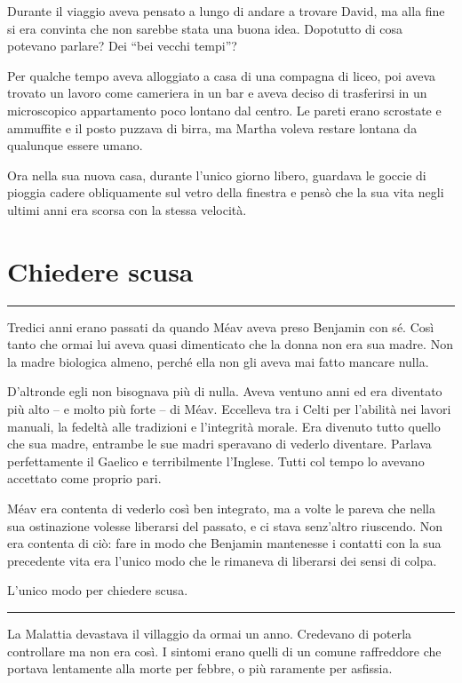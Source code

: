 \documentclass[a4paper,11pt,oneside,openright,final]{memoir}
\begin{document}
Durante il viaggio aveva pensato a lungo di andare a trovare David, ma alla fine
si era convinta che non sarebbe stata una buona idea. Dopotutto di cosa potevano
parlare? Dei ``bei vecchi tempi''?

Per qualche tempo aveva alloggiato a casa di una compagna di liceo, poi aveva
trovato un lavoro come cameriera in un bar e aveva deciso di trasferirsi in un
microscopico appartamento poco lontano dal centro. Le pareti erano scrostate e
ammuffite e il posto puzzava di birra, ma Martha voleva restare lontana da
qualunque essere umano.

Ora nella sua nuova casa, durante l'unico giorno libero, guardava le goccie di
pioggia cadere obliquamente sul vetro della finestra e pensò che la sua vita
negli ultimi anni era scorsa con la stessa velocità.

\chapter{Chiedere scusa}

\plainbreak{1}

Tredici anni erano passati da quando Méav aveva preso Benjamin con sé. Così
tanto che ormai lui aveva quasi dimenticato che la donna non era sua madre. Non
la madre biologica almeno, perché ella non gli aveva mai fatto mancare nulla.

D'altronde egli non bisognava più di nulla. Aveva ventuno anni ed era diventato
più alto -- e molto più forte -- di Méav. Eccelleva tra i Celti per
l'abilità nei lavori manuali, la fedeltà alle tradizioni e l'integrità
morale. Era divenuto tutto quello che sua madre, entrambe le sue madri speravano
di vederlo diventare. Parlava perfettamente il Gaelico e terribilmente
l'Inglese. Tutti col tempo lo avevano accettato come proprio pari.

Méav era contenta di vederlo così ben integrato, ma a volte le pareva che
nella sua ostinazione volesse liberarsi del passato, e ci stava senz'altro
riuscendo. Non era contenta di ciò: fare in modo che Benjamin mantenesse i
contatti con la sua precedente vita era l'unico modo che le rimaneva di
liberarsi dei sensi di colpa.

L'unico modo per chiedere scusa.

\plainbreak{1}

La Malattia devastava il villaggio da ormai un anno. Credevano di poterla
controllare ma non era così. I sintomi erano quelli di un comune raffreddore
che portava lentamente alla morte per febbre, o più raramente per asfissia.
\end{document}
